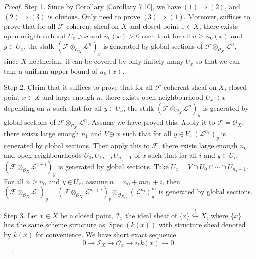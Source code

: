 \documentclass{ctexart}
\newcommand{\spec}{\operatorname{Spec}}
\begin{document}
\begin{proof}
    Step 1.
    Since by Corollary \ref{Corollary 7.10}, we have $(1) \Rightarrow (2)$, and $(2) \Rightarrow (3)$ is obvious.
    Only need to prove $(3) \Rightarrow (1)$.
    Moreover, suffices to prove that for all $\mathcal{F}$ coherent sheaf on $X$ and closed point $x\in X$,
    there exists open neighbourhood $U_{x}\ni x$ and $n_{0}(x) > 0$ such that for all $n \ge n_{0}(x)$ and $y\in U_{x}$,
    the stalk $(\mathcal{F} \otimes_{\mathcal{O}_{X}} \mathcal{L}^{n})_{y}$ is generated by global sections of $\mathcal{F} \otimes_{\mathcal{O}_{X}} \mathcal{L}^{n}$,
    since $X$ noetherian, it can be covered by only finitely many $U_{x}$ so that we can take a uniform upper bound of $n_{0}(x)$.
    \par
    Step 2.
    Claim that it suffices to prove that for all $\mathcal{F}$ coherent sheaf on $X$, closed point $x\in X$ and large enough $n$,
    there exists open neighbourhood $U_{x}\ni x$ depending on $n$ such that for all  $y\in U_{x}$,
    the stalk $(\mathcal{F} \otimes_{\mathcal{O}_{X}} \mathcal{L}^{n})_{y}$ is generated by global sections of $\mathcal{F} \otimes_{\mathcal{O}_{X}} \mathcal{L}^{n}$.
    Assume we have proved this.
    Apply it to $\mathcal{F} = \mathcal{O}_{X}$, there exists large enough $n_{1}$ and $V\ni x$ such that for all $y\in V$, $(\mathcal{L}^{n_{1}})_{y}$ is generated by global sections.
    Then apply this to $\mathcal{F}$, there exists large enough $n_{0}$ and open neighbourhoods $U_{0}, U_{1}, \cdots, U_{n_{1} - 1}$ of $x$ such that for all $i$ and $y\in U_{i}$,
    $(\mathcal{F} \otimes_{\mathcal{O}_{X}} \mathcal{L}^{n + i})_{y}$ is generated by global sections.
    Take $U_{x} = V \cap U_{0} \cap \cdots \cap U_{n_{1} - 1}$.
    For all $n \ge n_{0}$ and $y\in U_{x}$, assume $n = n_{0} + mn_{1} + i$, 
    then $(\mathcal{F} \otimes_{\mathcal{O}_{X}} \mathcal{L}^{n})_{y} = (\mathcal{F} \otimes_{\mathcal{O}_{X}} \mathcal{L}^{n_{0} + i})_{y} \otimes_{\mathcal{O}_{X, y}} (\mathcal{L}^{n_{1}})_{y}^{m}$ is generated by global sections.
    \par
    Step 3.
    Let $x\in X$ be a closed point, $\mathcal{I}_{x}$ the ideal sheaf of $\{x\} \overset{i}{\hookrightarrow} X$,
    where $\{x\}$ has the same scheme structure as $\spec(k(x))$ with structure sheaf denoted by $k(x)$ for convenience.
    We have short exact sequence
    \begin{equation*}
        0 \longrightarrow \mathcal{I}_{X} \longrightarrow \mathcal{O}_{x} \longrightarrow i_{\ast}k(x) \longrightarrow 0
    \end{equation*}

\end{proof}
\end{document}

